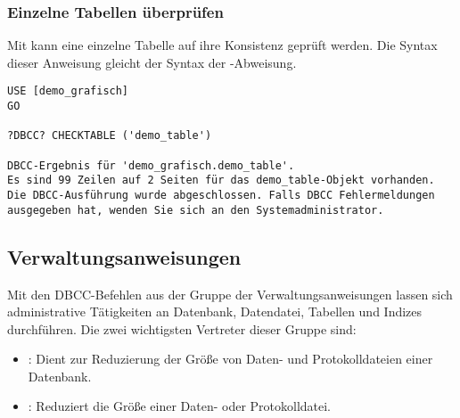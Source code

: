         \subsubsection{Einzelne Tabellen überprüfen}
          Mit  kann eine einzelne Tabelle auf
          ihre Konsistenz geprüft werden. Die Syntax dieser Anweisung gleicht
          der Syntax der -Abweisung.
\clearpage
          \begin{lstlisting}[language=ms_sql,caption={Konsistenzprüfung
          einer einzelnen Tabelle},label=admin03_33] 
USE [demo_grafisch]
GO

?DBCC? CHECKTABLE ('demo_table')

DBCC-Ergebnis für 'demo_grafisch.demo_table'.
Es sind 99 Zeilen auf 2 Seiten für das demo_table-Objekt vorhanden.
Die DBCC-Ausführung wurde abgeschlossen. Falls DBCC Fehlermeldungen 
ausgegeben hat, wenden Sie sich an den Systemadministrator.
          \end{lstlisting}         
          \begin{literaturinternet}
            \item \cite{ms176061}
            \item \cite{ms187332}
            \item \cite{ms174338}
            \item \cite{ms189496}
          \end{literaturinternet}
      \subsection{Verwaltungsanweisungen}
        Mit den DBCC-Befehlen aus der Gruppe der Verwaltungsanweisungen lassen
        sich administrative Tätigkeiten an Datenbank, Datendatei, Tabellen und
        Indizes durchführen. Die zwei wichtigsten Vertreter dieser Gruppe
        sind:
        \begin{itemize}
          \item {}: Dient zur Reduzierung der
          Größe von Daten- und Protokolldateien einer Datenbank.
          \item {}: Reduziert die Größe einer Daten-
          oder Protokolldatei.
       \end{itemize}
